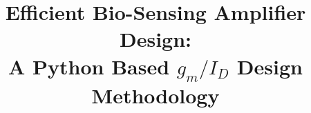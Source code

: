 \documentclass[conference]{IEEEtran}
\def\gmID{$g_m/I_D$ }
\begin{document}

\def\BibTeX{{\rm B\kern-.05em{\sc i\kern-.025em b}\kern-.08em
    T\kern-.1667em\lower.7ex\hbox{E}\kern-.125emX}}
    \setlength{\textfloatsep}{0\baselineskip plus 0\baselineskip minus 0\baselineskip}
\setlength{\dbltextfloatsep}{0\baselineskip plus 0\baselineskip minus 0\baselineskip}
\setlength{\floatsep}{0\baselineskip}
\setlength{\dblfloatsep}{0\baselineskip}

\title{Efficient Bio-Sensing Amplifier Design: \\A Python Based \gmID Design Methodology}



\maketitle










%

{}

\end{document}
